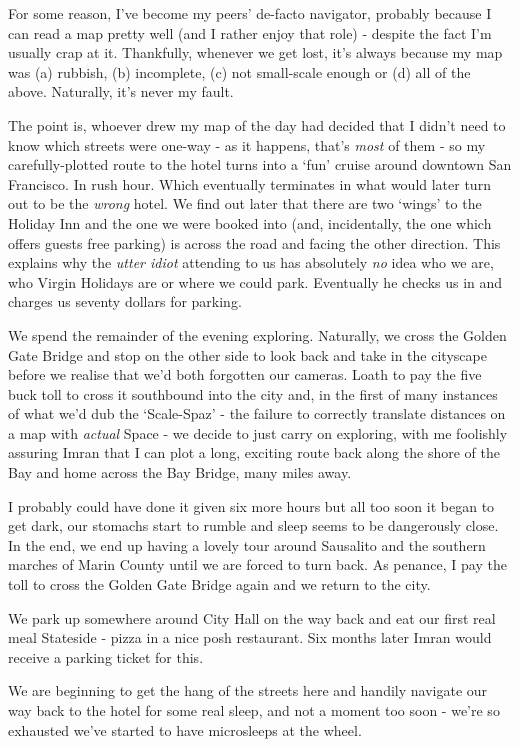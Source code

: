 \documentclass[a5paper,titlepage,11pt]{book}
\begin{document}
For some reason, I've become my peers' de-facto navigator, probably because I can read a map pretty well (and I rather enjoy that role) - despite the fact I'm usually crap at it.  Thankfully, whenever we get lost, it's always because my map was (a) rubbish, (b) incomplete, (c) not small-scale enough or (d) all of the above.  Naturally, it's never my fault.

The point is, whoever drew my map of the day had decided that I didn't need to know which streets were one-way - as it happens, that's \emph{most} of them - so my carefully-plotted route to the hotel turns into a `fun' cruise around downtown San Francisco.  In rush hour.  Which eventually terminates in what would later turn out to be the \emph{wrong} hotel.  We find out later that there are two `wings' to the Holiday Inn and the one we were booked into (and, incidentally, the one which offers guests free parking) is across the road and facing the other direction.  This explains why the \emph{utter idiot} attending to us has absolutely \emph{no} idea who we are, who Virgin Holidays are or where we could park.  Eventually he checks us in and charges us seventy dollars for parking.  

We spend the remainder of the evening exploring.  Naturally, we cross the Golden Gate Bridge and stop on the other side to look back and take in the cityscape before we realise that we'd both forgotten our cameras.  Loath to pay the five buck toll to cross it southbound into the city and, in the first of many instances of what we'd dub the `Scale-Spaz' - the failure to correctly translate distances on a map with \emph{actual} Space - we decide to just carry on exploring, with me foolishly assuring Imran that I can plot a long, exciting route back along the shore of the Bay and home across the Bay Bridge, many miles away.

I probably could have done it given six more hours but all too soon it began to get dark, our stomachs start to rumble and sleep seems to be dangerously close.  In the end, we end up having a lovely tour around Sausalito and the southern marches of Marin County until we are forced to turn back.  As penance, I pay the toll to cross the Golden Gate Bridge again and we return to the city.

We park up somewhere around City Hall on the way back and eat our first real meal Stateside - pizza in a nice posh restaurant.  Six months later Imran would receive a parking ticket for this.

We are beginning to get the hang of the streets here and handily navigate our way back to the hotel for some real sleep, and not a moment too soon - we're so exhausted we've started to have microsleeps at the wheel.
\end{document}
